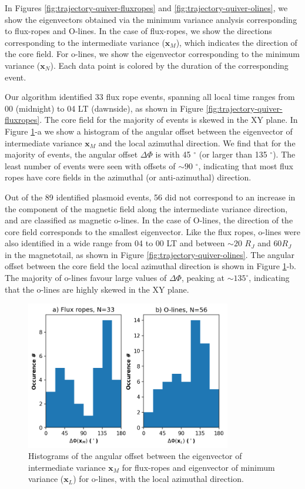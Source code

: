 In Figures \ref{fig:trajectory-quiver-fluxropes} and \ref{fig:trajectory-quiver-olines}, we show the eigenvectors obtained via the minimum variance analysis corresponding to flux-ropes and O-lines. In the case of flux-ropes, we show the directions corresponding to the intermediate variance ($\mathbf{x}_M$), which indicates the direction of the core field. For o-lines, we show the eigenvector corresponding to the minimum variance ($\mathbf{x}_N$). Each data point is colored by the duration of the corresponding event. 

Our algorithm identified 33 flux rope events, spanning all local time ranges from 00 (midnight) to 04 LT (dawnside), as shown in Figure \ref{fig:trajectory-quiver-fluxropes}. The core field for the majority of events is skewed in the XY plane. In Figure \ref{fig:histogram-of-dphi}-a we show a histogram of the angular offset between the eigenvector of intermediate variance $\mathbf{x}_M$ and the local azimuthal direction. We find that for the majority of events, the angular offset $\Delta\Phi$ is with 45 $^\circ$ (or larger than 135 $^\circ$). The least number of events were seen with offsets of $\sim90$ $^\circ$, indicating that most flux ropes have core fields in the azimuthal (or anti-azimuthal) direction.

Out of the 89 identified plasmoid events, 56 did not correspond to an increase in the component of the magnetic field along the intermediate variance direction, and are classified as magnetic o-lines. In the case of O-lines, the direction of the core field corresponds to the smallest eigenvector. Like the flux ropes, o-lines were also identified in a wide range from 04 to 00 LT and between $\sim20$ $R_J$ and $60 R_J$ in the magnetotail, as shown in Figure \ref{fig:trajectory-quiver-olines}. The angular offset between the core field the local azimuthal direction is shown in Figure \ref{fig:histogram-of-dphi}-b. The majority of o-lines favour large values of $\Delta\Phi$, peaking at $\sim135^\circ$, indicating that the o-lines are highly skewed in the XY plane. 

\begin{figure}
    \centering
    \includegraphics[width=0.8\textwidth]{images6/histogram_dphi.png}
    \caption{Histograms of the angular offset between the eigenvector of intermediate variance $\mathbf{x}_M$ for flux-ropes and eigenvector of minimum variance ($\mathbf{x}_L$) for o-lines, with the local azimuthal direction.}
    \label{fig:histogram-of-dphi}
\end{figure}

